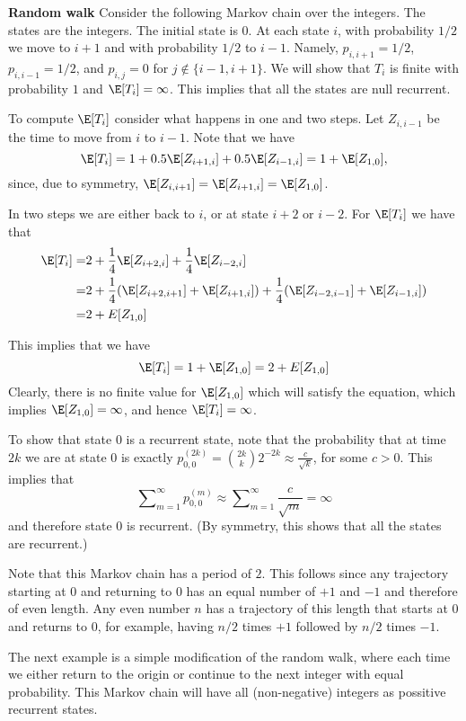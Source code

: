 \begin{example}{\bf Random walk}
Consider the following Markov chain over the integers. The states
are the integers. The initial state is $0$. At each state $i$, with
probability $1/2$ we move to $i+1$ and with probability $1/2$ to
$i-1$. Namely, $p_{i,i+1}=1/2$, $p_{i,i-1}=1/2$, and $p_{i,j} =0$
for $j \not\in \{i-1,i+ 1\}$. We will show that $T_i$ is finite with
probability $1$ and $\E[T_i]=\infty$. This implies that all the
states are null recurrent.

To compute $\E[T_i]$ consider what happens in one and two steps. Let
$Z_{i,i-1}$ be the time to move from $i$ to $i-1$. Note that  we
have \[
\E[T_i]=1+0.5\E[Z_{i+1,i}]+0.5\E[Z_{i-1,i}]=1+\E[Z_{1,0}],
\]
since, due to symmetry, $\E[Z_{i,i+1}]=\E[Z_{i+1,i}]=\E[Z_{1,0}]$.

In two steps we are either back to $i$, or at state $i+2$ or $i-2$.
For $\E[T_i]$ we have that
\begin{align*}
\E[T_i]=&
2+\frac{1}{4}\E[Z_{i+2,i}]+\frac{1}{4}\E[Z_{i-2,i}] \\
=&2+\frac{1}{4} (\E[Z_{i+2,i+1}]+\E[Z_{i+1,i}])+\frac{1}{4}( \E[Z_{i-2,i-1}]+\E[Z_{i-1,i}])\\
 =&2+E[Z_{1,0}]\\
\end{align*}

This implies that we have
\[
\E[T_i]=1+\E[Z_{1,0}]=2+E[Z_{1,0}]
\]
Clearly, there is no finite value for $\E[Z_{1,0}]$ which will
satisfy the equation, which implies $\E[Z_{1,0}]=\infty$, and hence
$\E[T_i]=\infty$.

To show that state $0$ is a recurrent state, note that the probability
that at time $2k$ we are at state $0$ is exactly $p_{0,0}^{(2k)}={2k
\choose k}2^{-2k}\approx \frac{c}{\sqrt{k}}$, for some $c>0$. This
implies that
$$
\sum\nolimits_{m = 1}^\infty {p_{0,0}^{(m)}}\approx \sum\nolimits_{m
= 1}^\infty \frac{c}{\sqrt{m}}=\infty
$$
and therefore state $0$ is recurrent. (By symmetry, this shows that
all the states are recurrent.)

Note that this Markov chain has a period of $2$. This follows since any trajectory starting at $0$ and returning to $0$ has an equal number of $+1$ and $-1$ and therefore of even length. Any even number $n$ has a trajectory of this length that starts at $0$ and returns to $0$, for example, having $n/2$ times $+1$ followed by $n/2$ times $-1$.
\end{example}

The next example is a simple modification of the random walk, where each time we either return to the origin or continue to the next integer with equal probability. 
This Markov chain will have all (non-negative) integers as possitive recurrent states.

